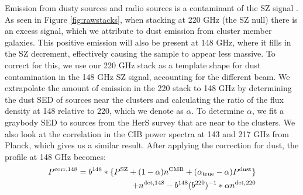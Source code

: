 \documentclass[a4paper,fleqn,usenatbib]{mnras}
\begin{document}
Emission from dusty sources and radio sources is a contaminant of the SZ signal \citep{2005A&A...439..901A}. As seen in Figure \ref{fig:rawstacks}, when stacking at 220 GHz (the SZ null) there is an excess signal, which we attribute to dust emission from cluster member galaxies. This positive emission will also be present at 148 GHz, where it fills in the SZ decrement, effectively causing the sample to appear less massive. To correct for this, we use our 220 GHz stack as a template shape for dust contamination in the 148 GHz SZ signal, accounting for the different beam. We extrapolate the amount of emission in the 220 stack to 148 GHz by determining the dust SED of sources near the clusters and calculating the ratio of the flux density at 148 relative to 220, which we denote as $\alpha$. To determine $\alpha$, we fit a graybody SED to sources from the HerS survey that are near to the clusters. We also look at the correlation in the CIB power spectra at 143 and 217 GHz from Planck, which gives us a similar result. 
After applying the correction for dust, the profile at 148 GHz becomes:
\begin{equation}
\begin{split}
  P^{\rm corr,148} = b^{148} \ast \{ P^{\rm SZ} 
+ (1 - \alpha) n^{\rm CMB} + (\alpha_{\rm true} - \alpha) P^{\rm dust} \} 
\\+ n^{\rm det,148} - b^{148}( b^{220})^{-1} \ast \alpha n^{\rm det,220} 
  \end{split}
\end{equation}

\end{document}
